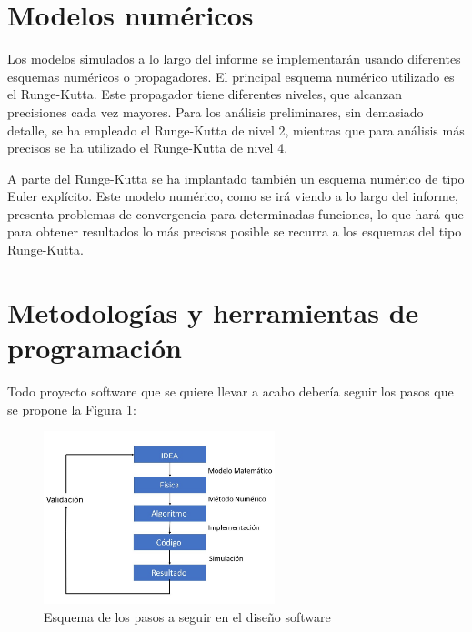 \documentclass[11pt,singlespacing,liststotoc,headsepline,a4paper]{article}
\begin{document}
\section{Modelos numéricos}
Los modelos simulados a lo largo del informe se implementarán usando diferentes esquemas numéricos o propagadores. El principal esquema numérico utilizado es el Runge-Kutta. Este propagador tiene diferentes niveles, que alcanzan precisiones cada vez mayores. Para los análisis preliminares, sin demasiado detalle, se ha empleado el Runge-Kutta de nivel 2, mientras que para análisis más precisos se ha utilizado el Runge-Kutta de nivel 4.

A parte del Runge-Kutta se ha implantado también un esquema numérico de tipo Euler explícito. Este modelo numérico, como se irá viendo a lo largo del informe, presenta problemas de convergencia para determinadas funciones, lo que hará que para obtener resultados lo más precisos posible se recurra a los esquemas del tipo Runge-Kutta.


	\newpage

\section{Metodologías y herramientas de programación}

Todo proyecto software que se quiere llevar a acabo debería seguir los pasos que se propone la Figura \ref{Esquema}:

\begin{figure}[htbp]
	\centering
	\includegraphics[width=0.6\textwidth]{Esquema.JPG}
	\caption{Esquema de los pasos a seguir en el diseño software}
	\label{Esquema}
\end{figure}
\end{document}
